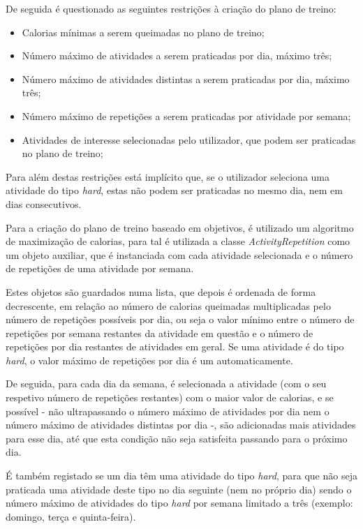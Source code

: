 \documentclass[a4paper,12pt]{scrreprt}
\begin{document}
    De seguida é questionado as seguintes restrições à criação do plano de treino:
    \begin{itemize}
        \item Calorias mínimas a serem queimadas no plano de treino;
        \item Número máximo de atividades a serem praticadas por dia, máximo três;
        \item Número máximo de atividades distintas a serem praticadas por dia, máximo três;
        \item Número máximo de repetições a serem praticadas por atividade por semana;
        \item Atividades de interesse selecionadas pelo utilizador, que podem ser praticadas no plano de treino;
    \end{itemize}

    Para além destas restrições está implícito que, se o utilizador seleciona uma atividade do tipo \textit{hard},
    estas não podem ser praticadas no mesmo dia, nem em dias consecutivos.

    Para a criação do plano de treino baseado em objetivos, é utilizado um algoritmo de maximização de calorias,
    para tal é utilizada a classe \textit{ActivityRepetition} como um objeto auxiliar,
    que é instanciada com cada atividade selecionada e o número de repetições de uma atividade por semana.

    Estes objetos são guardados numa lista, que depois é ordenada de forma decrescente,
    em relação ao número de calorias queimadas multiplicadas pelo número de repetições possíveis por dia,
    ou seja o valor mínimo entre o número de repetições por semana restantes da atividade em questão e o
    número de repetições por dia restantes de atividades em geral. Se uma atividade é do tipo \textit{hard},
    o valor máximo de repetições por dia é um automaticamente.

    De seguida, para cada dia da semana, é selecionada a atividade (com o seu respetivo número de repetições restantes)
    com o maior valor de calorias, e se possível - não ultrapassando o número máximo de atividades por dia
    nem o número máximo de atividades distintas por dia -,
    são adicionadas mais atividades para esse dia, até que esta condição não seja satisfeita passando para o próximo dia.

    É também registado se um dia têm uma atividade do tipo \textit{hard},
    para que não seja praticada uma atividade deste tipo no dia seguinte (nem no próprio dia)
    sendo o número máximo de atividades do tipo \textit{hard} por semana limitado a três
    (exemplo: domingo, terça e quinta-feira).
\end{document}
